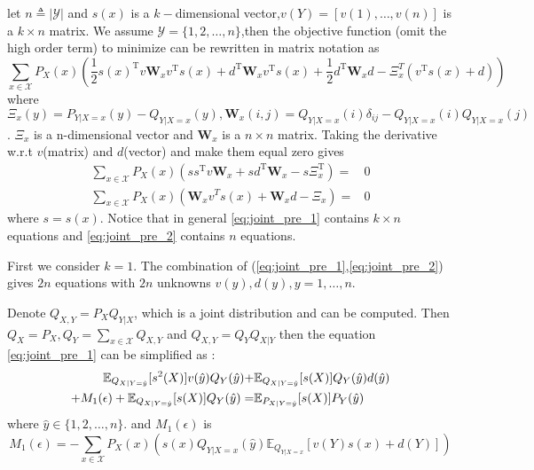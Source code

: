 \documentclass{article}
\def\T{\mathrm{T}}
\def\E{\mathbb{E}}
\begin{document}
let $n\triangleq |\mathcal{Y}|$ and $s(x)$ is a $k-$dimensional vector,$v(Y)=[v(1),\dots,v(n)]$ is a $k\times n$ matrix.
We assume $\mathcal{Y}=\{1,2,\dots,n\}$,then the objective function (omit the high order term) to minimize can be rewritten in matrix notation as
\begin{equation}\label{eq:min}
\sum_{x\in \mathcal{X}} P_X(x)\left(\frac{1}{2}s(x)^\T v \bm{W}_x v^\T s(x) +d^\T \bm{W}_x v^\T s(x)+\frac{1}{2}d^\T \bm{W}_x d-\Xi_x^T (v^\T s(x)+d)\right)
\end{equation}
where $\Xi_x(y)=P_{Y|X=x}(y)-Q_{Y|X=x}(y),\bm{W}_x(i,j)=Q_{Y|X=x}(i)\delta_{ij}-Q_{Y|X=x}(i)Q_{Y|X=x}(j)$.
$\Xi_x$ is a n-dimensional vector and $\bm{W}_x$ is a $n\times n$ matrix.
Taking the derivative w.r.t $v$(matrix) and $d$(vector) and make them equal zero gives
\begin{align}
\sum_{x\in \mathcal{X}} P_X(x)\left(ss^\T v \bm{W}_x+sd^\T \bm{W}_x-s\Xi_x^\T\right) = & 0 \label{eq:joint_pre_1}\\
\sum_{x\in \mathcal{X}} P_X(x)\left(\bm{W}_x v^Ts(x)+ \bm{W}_x d-\Xi_x\right)=& 0\label{eq:joint_pre_2}
\end{align}
where $s=s(x)$.
Notice that in general \eqref{eq:joint_pre_1} contains $k\times n$ equations and \eqref{eq:joint_pre_2} contains $n$ equations.



First we consider $k=1$. The combination of (\ref{eq:joint_pre_1},\ref{eq:joint_pre_2}) gives $2n$ equations with $2n$ unknowns $v(y),d(y),y=1,\dots,n$.

Denote $Q_{X,Y}=P_X Q_{Y|X}$, which is a joint distribution and can be computed.
Then $Q_{X}=P_X,Q_{Y}=\sum_{x\in \mathcal{X}}Q_{X,Y}$ and $Q_{X,Y}=Q_Y Q_{X|Y}$
 then the equation \eqref{eq:joint_pre_1} can be simplified as :
\begin{align}\notag
\E_{Q_{X|Y=\hat{y}}}[s^2(X)]v(\hat{y})Q_Y(\hat{y})+&\E_{Q_{X|Y=\hat{y}}}[s(X)]Q_Y(\hat{y})d(\hat{y}) \\
+M_1(\epsilon)+\E_{Q_{X|Y=\hat{y}}}[s(X)]Q_Y(\hat{y})=& \E_{P_{X|Y=\hat{y}}}[s(X)]P_Y(\hat{y})\label{eq:joint_simplify_1}
\end{align}
where $\hat{y}\in \{1,2,\dots,n\}$. and $M_1(\epsilon)$ is
$$
M_1(\epsilon)=-\sum_{x\in \mathcal{X}}P_X(x)\left(s(x)Q_{Y|X=x}(\hat{y})\E_{Q_{Y|X=x}}[v(Y)s(x)+d(Y)]\right)
$$
\end{document}
